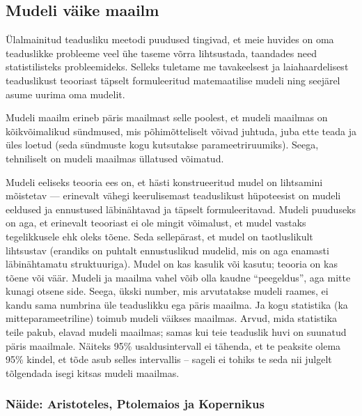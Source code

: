 \documentclass[]{book}
\begin{document}
\subsection{Mudeli väike maailm}\label{mudeli-vaike-maailm}

Ülalmainitud teadusliku meetodi puudused tingivad, et meie huvides on
oma teaduslikke probleeme veel ühe taseme võrra lihtsustada, taandades
need statistilisteks probleemideks. Selleks tuletame me tavakeelsest ja
laiahaardelisest teaduslikust teooriast täpselt formuleeritud
matemaatilise mudeli ning seejärel asume uurima oma mudelit.

Mudeli maailm erineb päris maailmast selle poolest, et mudeli maailmas
on kõikvõimalikud sündmused, mis põhimõtteliselt võivad juhtuda, juba
ette teada ja üles loetud (seda sündmuste kogu kutsutakse
parameetriruumiks). Seega, tehniliselt on mudeli maailmas üllatused
võimatud.

Mudeli eeliseks teooria ees on, et hästi konstrueeritud mudel on
lihtsamini mõistetav --- erinevalt vähegi keerulisemast teaduslikust
hüpoteesist on mudeli eeldused ja ennustused läbinähtavad ja täpselt
formuleeritavad. Mudeli puuduseks on aga, et erinevalt teooriast ei ole
mingit võimalust, et mudel vastaks tegelikkusele ehk oleks tõene. Seda
sellepärast, et mudel on taotluslikult lihtsustav (erandiks on puhtalt
ennustuslikud mudelid, mis on aga enamasti läbinähtamatu struktuuriga).
Mudel on kas kasulik või kasutu; teooria on kas tõene või väär. Mudeli
ja maailma vahel võib olla kaudne ``peegeldus'', aga mitte kunagi otsene
side. Seega, ükski number, mis arvutatakse mudeli raames, ei kandu sama
numbrina üle teaduslikku ega päris maailma. Ja kogu statistika (ka
mitteparameetriline) toimub mudeli väikses maailmas. Arvud, mida
statistika teile pakub, elavad mudeli maailmas; samas kui teie teaduslik
huvi on suunatud päris maailmale. Näiteks 95\% usaldusintervall ei
tähenda, et te peaksite olema 95\% kindel, et tõde asub selles
intervallis -- sageli ei tohiks te seda nii julgelt tõlgendada isegi
kitsas mudeli maailmas.

\subsubsection{Näide: Aristoteles, Ptolemaios ja
Kopernikus}\label{naide-aristoteles-ptolemaios-ja-kopernikus}
\end{document}
